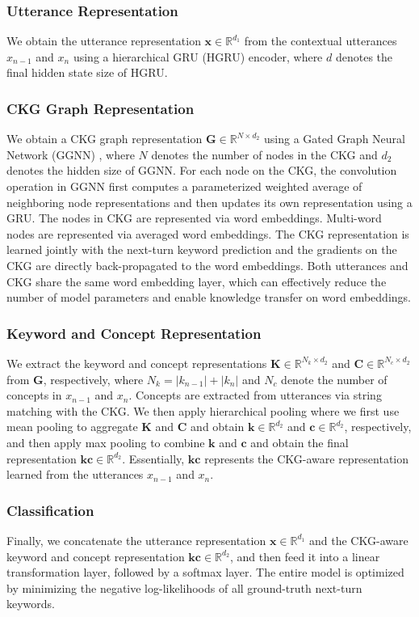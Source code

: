 \documentclass[letterpaper]{article} %
\begin{document}
\subsubsection{Utterance Representation}
We obtain the utterance representation $\mathbf{x} \in \mathbb{R}^{d_1}$ from the contextual utterances $x_{n-1}$ and $x_{n}$ using a hierarchical GRU (HGRU) encoder, where $d$ denotes the final hidden state size of HGRU.
\subsubsection{CKG Graph Representation}
We obtain a CKG graph representation $\mathbf{G} \in \mathbb{R}^{N\times d_2}$ using a Gated Graph Neural Network (GGNN) \cite{li2016gated}, where $N$ denotes the number of nodes in the CKG and $d_2$ denotes the hidden size of GGNN. For each node on the CKG, the convolution operation in GGNN first computes a parameterized weighted average of neighboring node representations and then updates its own representation using a GRU. The nodes in CKG are represented via word embeddings. Multi-word nodes are represented via averaged word embeddings. The CKG representation is learned jointly with the next-turn keyword prediction and the gradients on the CKG are directly back-propagated to the word embeddings. Both utterances and CKG share the same word embedding layer, which can effectively reduce the number of model parameters and enable knowledge transfer on word embeddings.
\subsubsection{Keyword and Concept Representation}
We extract the keyword and concept representations $\mathbf{K} \in \mathbb{R}^{N_k \times d_2}$ and $\mathbf{C} \in \mathbb{R}^{N_c \times d_2}$ from $\mathbf{G}$, respectively, where $N_k = |k_{n-1}| + |k_{n}|$ and $N_c$ denote the number of concepts in $x_{n-1}$ and $x_{n}$. Concepts are extracted from utterances via string matching with the CKG. We then apply hierarchical pooling where we first use mean pooling to aggregate $\textbf{K}$ and $\textbf{C}$ and obtain $\textbf{k} \in \mathbb{R}^{d_2}$ and $\textbf{c} \in \mathbb{R}^{d_2}$, respectively, and then apply max pooling to combine $\textbf{k}$ and $\textbf{c}$ and obtain the final representation $\mathbf{kc} \in \mathbb{R}^{d_2}$. Essentially,  $\mathbf{kc}$ represents the CKG-aware representation learned from the utterances $x_{n-1}$ and $x_{n}$.
\subsubsection{Classification}
Finally, we concatenate the utterance representation $\mathbf{x} \in \mathbb{R}^{d_1}$ and the CKG-aware keyword and concept representation $\mathbf{kc} \in \mathbb{R}^{d_2}$, and then feed it into a linear transformation layer, followed by a softmax layer. The entire model is optimized by minimizing the negative log-likelihoods of all ground-truth next-turn keywords.
\end{document}
